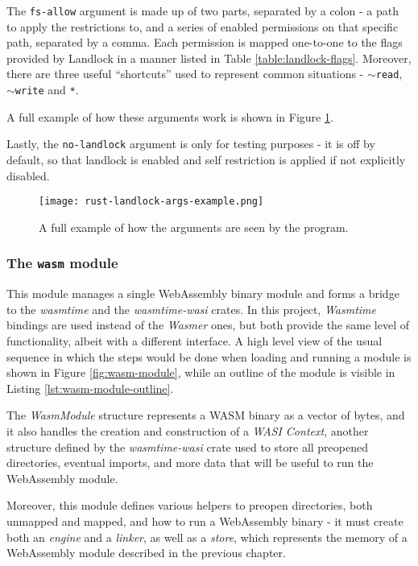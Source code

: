 The \texttt{fs-allow} argument is made up of two parts, separated by a colon - a path to apply the restrictions to,
and a series of enabled permissions on that specific path, separated by a comma.
Each permission is mapped one-to-one to the flags provided by Landlock in a manner listed in Table \ref{table:landlock-flags}.
Moreover, there are three useful ``shortcuts'' used to represent common situations - \texttt{$\sim$read}, \texttt{$\sim$write} and \texttt{*}.

A full example of how these arguments work is shown in Figure \ref{fig:args-example}.

Lastly, the \texttt{no-landlock} argument is only for testing purposes - it is off by default, so that
landlock is enabled and self restriction is applied if not explicitly disabled.

\begin{figure}[ht]
  \centering
  \texttt{[image: rust-landlock-args-example.png]}
  \caption{A full example of how the arguments are seen by the program.}
  \label{fig:args-example}
\end{figure}

\subsubsection{The \texttt{wasm} module}

This module manages a single WebAssembly binary module and forms a bridge to the \textit{wasmtime} and the \textit{wasmtime-wasi}
crates. In this project, \textit{Wasmtime} bindings are used instead of the \textit{Wasmer} ones, but both provide the
same level of functionality, albeit with a different interface. A high level view of the usual sequence in which the steps would be done
when loading and running a module is shown in Figure \ref{fig:wasm-module}, while an outline of the module is visible
in Listing \ref{lst:wasm-module-outline}.

The \textit{WasmModule} structure represents a WASM binary as a vector of bytes, and it also handles the creation
and construction of a \textit{WASI Context}, another structure defined by the \textit{wasmtime-wasi} crate used to store
all preopened directories, eventual imports, and more data that will be useful to run the WebAssembly module.

Moreover, this module defines various helpers to preopen directories, both unmapped and mapped, and
how to run a WebAssembly binary - it must create both an \textit{engine} and a \textit{linker},
as well as a \textit{store}, which represents the memory of a WebAssembly module described in the previous chapter.

